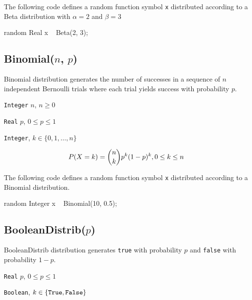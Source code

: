 The following code defines a random function symbol \verb|x| distributed according to a Beta distribution with $\alpha = 2$ and $\beta = 3$
\begin{blogcode}
random Real x ~ Beta(2, 3);
\end{blogcode}


\subsection{Binomial($n$, $p$)} 
Binomial distribution generates the number of successes in a sequence of $n$ independent Bernoulli trials where each trial yields success with probability $p$.

\begin{itemize*}
\item[] \verb|Integer| $n$, $n \geq 0$
\item[] \verb|Real| $p$, $0 \leq p \leq 1$
\end{itemize*}

\begin{itemize*}
\item[] \verb|Integer|, $k \in \{0, 1, \ldots, n\} $
\end{itemize*}

\[
	P(X = k) = \binom{n}{k}p^{k}(1-p)^{k} , 0 \leq k \leq n \\
\]

The following code defines a random function symbol \verb|x| distributed according to a Binomial distribution.
\begin{blogcode}
random Integer x ~ Binomial(10, 0.5);
\end{blogcode}

\subsection{BooleanDistrib($p$)} \label{boolean-distribution-section}
BooleanDistrib distribution generates \verb|true| with probability $p$ and \verb|false| with probability $1-p$. 

\begin{itemize*}
\item[] \verb|Real|
 $p$, $0 \leq p \leq 1$ 
\end{itemize*}

\begin{itemize*}
\item[] \verb|Boolean|, $k \in \{\verb|True|, \verb|False|\}$ 
\end{itemize*}

